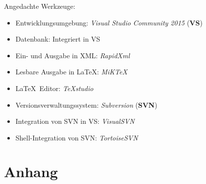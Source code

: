 \documentclass[english,ngerman,parskip=half,headsepline,footsepline]{scrreprt}
\begin{document}
	Angedachte Werkzeuge:
	\begin{itemize}
		\item \label{Werkzeug:VSC} Entwicklungsumgebung: \emph{Visual Studio Community 2015} (\textbf{VS})
		\item \label{Werkzeug:VSCDB} Datenbank: Integriert in VS
		\item \label{Werkzeug:RapidXml} Ein- und Ausgabe in XML: \emph{RapidXml}
		\item \label{Werkzeug:MiKTeX} Lesbare Ausgabe in \LaTeX: \emph{MiK\TeX}
		\item \label{Werkzeug:TeXstudio} \LaTeX\ Editor: \emph{\TeX studio}
		\item \label{Werkzeug:Subversion} Versionsverwaltungssystem: \emph{Subversion} (\textbf{SVN})
		\item \label{Werkzeug:VisualSVN} Integration von SVN in VS: \emph{VisualSVN}
		\item \label{Werkzeug:TortoiseSVN} Shell-Integration von SVN: \emph{TortoiseSVN}
	\end{itemize}
	
	
	\appendix
	
	\chapter{Anhang}
	\thispagestyle{scrheadings}
	
\end{document}

